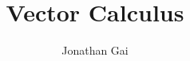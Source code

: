 
\usepackage{bbm}
\usepackage{nicefrac}
\author{Jonathan Gai}
\title{Vector Calculus}


\maketitle
\tableofcontents
{}
